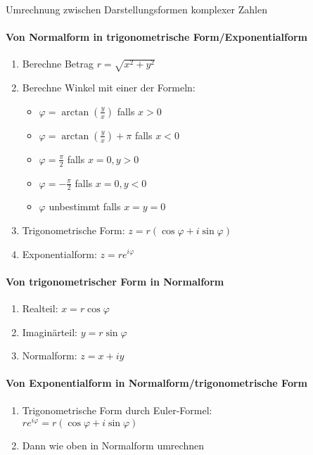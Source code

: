 \begin{KR}{Umrechnung zwischen Darstellungsformen komplexer Zahlen}
\paragraph{Von Normalform in trigonometrische Form/Exponentialform}
\begin{enumerate}
   \item Berechne Betrag $r = \sqrt{x^2 + y^2}$
   \item Berechne Winkel mit einer der Formeln: %
   \begin{itemize}
       \item $\varphi = \arctan(\frac{y}{x})$ falls $x > 0$
       \item $\varphi = \arctan(\frac{y}{x}) + \pi$ falls $x < 0$
       \item $\varphi = \frac{\pi}{2}$ falls $x = 0, y > 0$
       \item $\varphi = -\frac{\pi}{2}$ falls $x = 0, y < 0$
       \item $\varphi$ unbestimmt falls $x = y = 0$
   \end{itemize}
   \item Trigonometrische Form: $z = r(\cos\varphi + i\sin\varphi)$
   \item Exponentialform: $z = re^{i\varphi}$
\end{enumerate}

\paragraph{Von trigonometrischer Form in Normalform}
\begin{enumerate}
   \item Realteil: $x = r\cos\varphi$
   \item Imaginärteil: $y = r\sin\varphi$
   \item Normalform: $z = x + iy$
\end{enumerate}

\paragraph{Von Exponentialform in Normalform/trigonometrische Form}
\begin{enumerate}
   \item Trigonometrische Form durch Euler-Formel:\\
   $re^{i\varphi} = r(\cos\varphi + i\sin\varphi)$
   \item Dann wie oben in Normalform umrechnen
\end{enumerate}


\end{KR}
